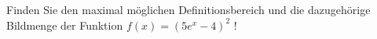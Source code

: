 \item 
Finden Sie den maximal möglichen Definitionsbereich und die dazugehörige Bildmenge der Funktion $f(x)=(5e^x-4)^2$ !
